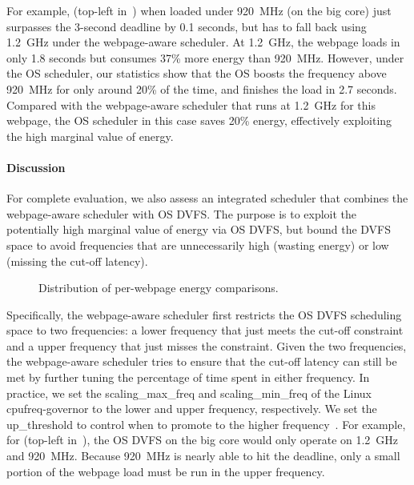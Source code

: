 For example,  (top-left in~) when loaded under 920~MHz (on the big core) just surpasses the 3-second deadline by 0.1 seconds, but has to fall back using 1.2~GHz under the webpage-aware scheduler. At 1.2~GHz, the webpage loads in only 1.8 seconds but consumes 37\% more energy than 920~MHz. However, under the OS scheduler, our statistics show that the OS boosts the frequency above 920~MHz for only around 20\% of the time, and finishes the load in 2.7 seconds. Compared with the webpage-aware scheduler that runs at 1.2~GHz for this webpage, the OS scheduler in this case saves 20\% energy, effectively exploiting the high marginal value of energy.

\paragraph{Discussion} For complete evaluation, we also assess an integrated scheduler that combines the webpage-aware scheduler with OS DVFS. The purpose is to exploit the potentially high marginal value of energy via OS DVFS, but bound the DVFS space to avoid frequencies that are unnecessarily high (wasting energy) or low (missing the cut-off latency).

\begin{figure}[t]
\hspace*{15pt}
\caption{Distribution of per-webpage energy comparisons.}
\label{fig:e_saving}
\end{figure}

Specifically, the webpage-aware scheduler first restricts the OS DVFS scheduling space to two frequencies: a lower frequency that just meets the cut-off constraint and a upper frequency that just misses the constraint. Given the two frequencies, the webpage-aware scheduler tries to ensure that the cut-off latency can still be met by further tuning the percentage of time spent in either frequency. In practice, we set the \textsf{scaling\_max\_freq} and \textsf{scaling\_min\_freq} of the Linux cpufreq-governor to the lower and upper frequency, respectively. We set the \textsf{up\_threshold} to control when to promote to the higher frequency~\cite{ondemand}. For example, for  (top-left in~), the OS DVFS on the big core would only operate on 1.2~GHz and 920~MHz. Because 920~MHz is nearly able to hit the deadline, only a small portion of the webpage load must be run in the upper frequency.  

